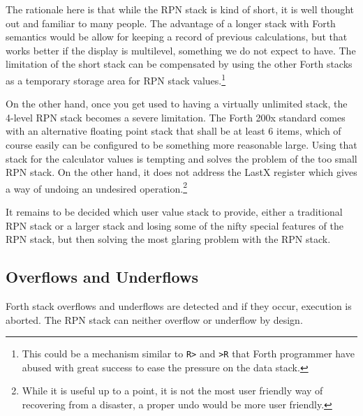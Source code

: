 \documentclass[a4paper]{article}
\begin{document}
The rationale here is that while the RPN stack is kind of short, it is well thought out and familiar to many people. The advantage of a longer stack with Forth semantics would be allow for keeping a record of previous calculations, but that works better if the display is multilevel, something we do not expect to have. The limitation of the short stack can be compensated by using the other Forth stacks as a temporary storage area for RPN stack values.\footnote{This could be a mechanism similar to {\tt R>} and {\tt >R} that Forth programmer have abused with great success to ease the pressure on the data stack.}

On the other hand, once you get used to having a virtually unlimited stack, the 4-level RPN stack becomes a severe limitation. The Forth 200x standard comes with an alternative floating point stack that shall be at least 6 items, which of course easily can be configured to be something more reasonable large. Using that stack for the calculator values is tempting and solves the problem of the too small RPN stack. On the other hand, it does not address the LastX register which gives a way of undoing an undesired operation.\footnote{While it is useful up to a point, it is not the most user friendly way of recovering from a disaster, a proper undo would be more user friendly.}

It remains to be decided which user value stack to provide, either a traditional RPN stack or a larger stack and losing some of the nifty special features of the RPN stack, but then solving the most glaring problem with the RPN stack.

\subsection{Overflows and Underflows}
Forth stack overflows and underflows are detected and if they occur, execution is aborted.  The RPN stack can neither overflow or underflow by design.
\end{document}

